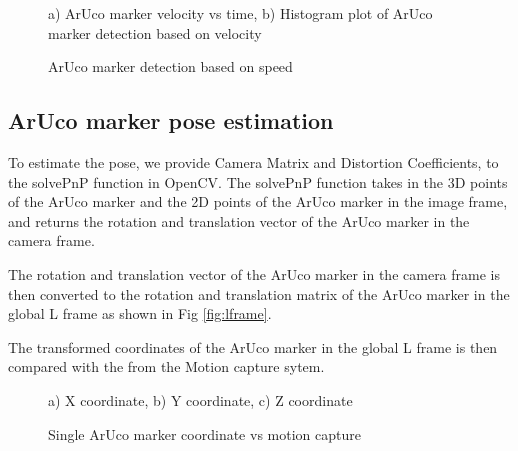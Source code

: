 \documentclass[12pt, twoside]{report}
\begin{document}
\begin{figure}[hbt!]
    \centering
    \caption{ArUco marker detection based on speed}
    {a) ArUco marker velocity vs time,
        b) Histogram plot of ArUco marker detection based on velocity}
    \label{fig:ar_vel}
\end{figure}



\subsection{ArUco marker pose estimation}

To estimate the pose, we provide Camera Matrix and Distortion Coefficients,
to the solvePnP function in OpenCV. The solvePnP function takes in the 3D points
of the ArUco marker and the 2D points of the ArUco marker in the image frame,
and returns the rotation and translation vector of the ArUco marker in the camera frame.

The rotation and translation vector of the ArUco marker in the camera frame is then
converted to the rotation and translation matrix of the ArUco marker in the global L frame
as shown in Fig \ref{fig:lframe}.

The transformed coordinates of the ArUco marker in the global L frame is then compared with
the from the Motion capture sytem.

\begin{figure}[hbt!]
    \centering
    \caption{Single ArUco marker coordinate vs motion capture}
    {a) X coordinate, b) Y coordinate, c) Z coordinate}
    \label{fig:ar_coord}
\end{figure}
\end{document}

